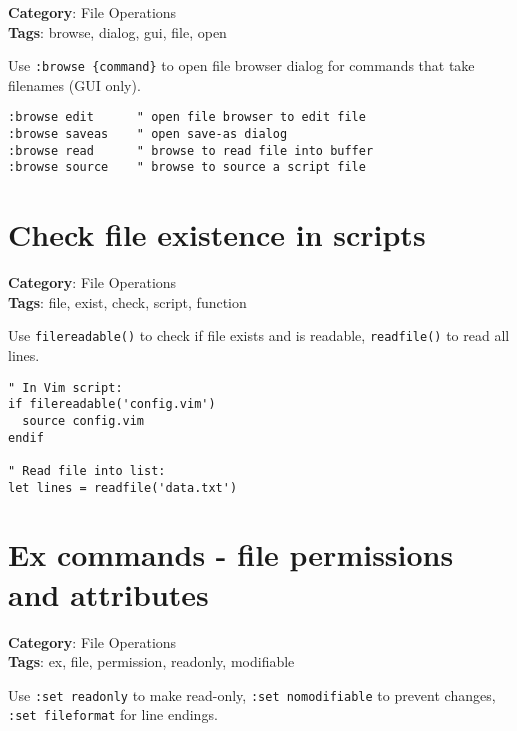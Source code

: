{{{{{\textbf{Category}: File Operations\\ \textbf{Tags}: browse, dialog, gui, file, open
\vspace{0.5cm}

Use {\footnotesize \Verb§:browse {command}§} to open file browser dialog for commands that take filenames (GUI only).

\begin{Exa*}{}
\begin{Verbatim}[fontsize=\footnotesize, breaklines, breakanywhere]
:browse edit      " open file browser to edit file
:browse saveas    " open save-as dialog
:browse read      " browse to read file into buffer
:browse source    " browse to source a script file
\end{Verbatim}
\end{Exa*}

\section{Check file existence in scripts}

\textbf{Category}: File Operations\\ \textbf{Tags}: file, exist, check, script, function
\vspace{0.5cm}

Use {\footnotesize \Verb§filereadable()§} to check if file exists and is readable, {\footnotesize \Verb§readfile()§} to read all lines.

\begin{Exa*}{}
\begin{Verbatim}[fontsize=\footnotesize, breaklines, breakanywhere]
" In Vim script:
if filereadable('config.vim')
  source config.vim
endif

" Read file into list:
let lines = readfile('data.txt')
\end{Verbatim}
\end{Exa*}

\section{Ex commands - file permissions and attributes}

\textbf{Category}: File Operations\\ \textbf{Tags}: ex, file, permission, readonly, modifiable
\vspace{0.5cm}

Use {\footnotesize \Verb§:set readonly§} to make read-only, {\footnotesize \Verb§:set nomodifiable§} to prevent changes, {\footnotesize \Verb§:set fileformat§} for line endings.

}}}}}
